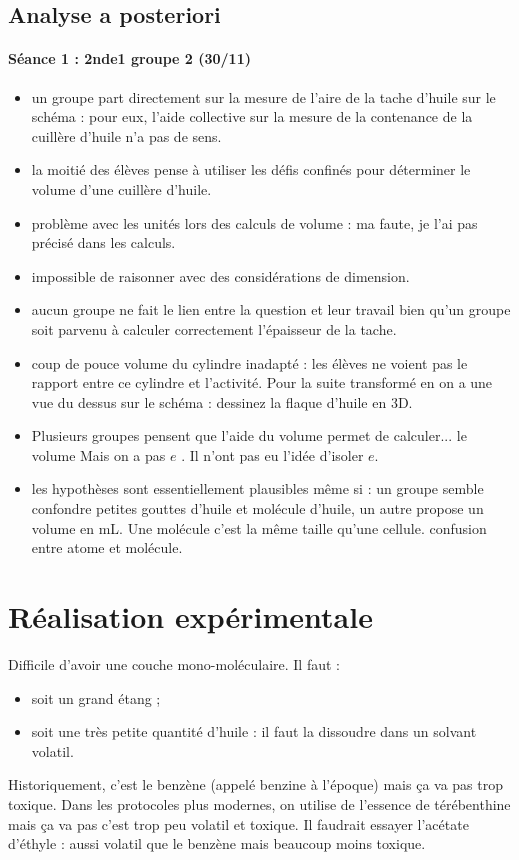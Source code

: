 \documentclass[12pt,a4paper]{article}
\begin{document}
\subsection{Analyse a posteriori}

\paragraph{Séance 1 : 2nde1 groupe 2 (30/11)}
\begin{itemize}
\item un groupe part directement sur la mesure de l'aire de la tache d'huile sur le schéma : pour eux, l'aide collective sur la mesure de la contenance de la cuillère d'huile n'a pas de sens.
\item la moitié des élèves pense à utiliser les défis confinés pour déterminer le volume d'une cuillère d'huile.
\item problème avec les unités lors des calculs de volume : ma faute, je l'ai pas précisé dans les calculs.
\item impossible de raisonner avec des considérations de dimension.
\item aucun groupe ne fait le lien entre la question et leur travail bien qu'un groupe soit parvenu à calculer correctement l'épaisseur de la tache.
\item coup de pouce volume du cylindre inadapté : les élèves ne voient pas le rapport entre ce cylindre et l'activité. Pour la suite transformé en \og on a une vue du dessus sur le schéma : dessinez la flaque d'huile en 3D. \fg{}
\item Plusieurs groupes pensent que l'aide du volume permet de calculer... le volume \og Mais on a pas $e$ \fg{}.
Il n'ont pas eu l'idée d'isoler $e$. 
\item les hypothèses sont essentiellement plausibles même si : un groupe semble confondre petites gouttes d'huile et molécule d'huile, un autre propose un volume en mL.
Une molécule c'est la même taille qu'une cellule.
confusion entre atome et molécule.
\end{itemize}


\newpage
\section{Réalisation expérimentale}

Difficile d'avoir une couche mono-moléculaire.
Il faut :
\begin{itemize}
\item soit un grand étang ;
\item soit une très petite quantité d'huile : il faut la dissoudre dans un solvant volatil.
\end{itemize}
Historiquement, c'est le benzène (appelé benzine à l'époque) mais ça va pas trop toxique.
Dans les protocoles plus modernes, on utilise de l'essence de térébenthine mais ça va pas c'est trop peu volatil et toxique.
Il faudrait essayer l'acétate d'éthyle : aussi volatil que le benzène mais beaucoup moins toxique.
 
\end{document}
